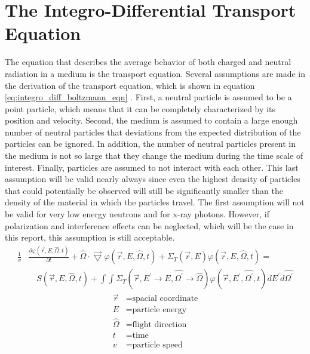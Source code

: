 \section{The Integro-Differential Transport Equation}
\label{sec:int_diff_transport_eqn}
The equation that describes the average behavior of both charged and neutral
radiation in a medium is the transport equation. Several assumptions are made 
in the derivation of the transport equation, which is shown in equation 
\ref{eq:integro_diff_boltzmann_eqn} \citep{bell_nuclear_1979}. First, a neutral 
particle is assumed to be a point particle, which means that it can be 
completely characterized by its position and velocity. Second, the medium is 
assumed to contain a large enough number of neutral particles that deviations 
from the expected distribution of the particles can be ignored. In addition, 
the number of neutral particles present in the medium is not so large that they 
change the medium during the time scale of interest. Finally, particles 
are assumed to not interact with each other. This last assumption will be valid 
nearly always since even the highest density of particles that could potentially
be observed will still be significantly smaller than the density of the 
material in which the particles travel. The first assumption will not be valid 
for very low energy neutrons and for x-ray photons. However, if polarization 
and interference effects can be neglected, which will be the case in this 
report, this assumption is still acceptable. 
\begin{equation}
  \begin{split}
    \frac{1}{v}&\frac{\partial \varphi(\vec{r},E,\hat{\Omega},t)}{\partial t} +
    \hat{\Omega} \cdot \vec{\bigtriangledown} \varphi(\vec{r},E,\hat{\Omega},t)
    + \Sigma_T(\vec{r},E) \varphi(\vec{r},E,\hat{\Omega},t) = \\
    & \quad S(\vec{r},E,\hat{\Omega},t) +
    \int\int \Sigma_T(\vec{r},E^{'} \to E,\hat{\Omega^{'}} \to \hat{\Omega})
    \varphi(\vec{r},E^{'},\hat{\Omega^{'}},t) dE^{'}d\hat{\Omega^{'}} 
  \end{split}
  \label{eq:integro_diff_boltzmann_eqn}
\end{equation}
\begin{align}
  \vec{r} & = \text{spacial coordinate} \nonumber \\
  E & = \text{particle energy} \nonumber \\
  \hat{\Omega} & = \text{flight direction} \nonumber \\
  t & = \text{time} \nonumber \\
  v & = \text{particle speed} \nonumber \\
\end{align}

